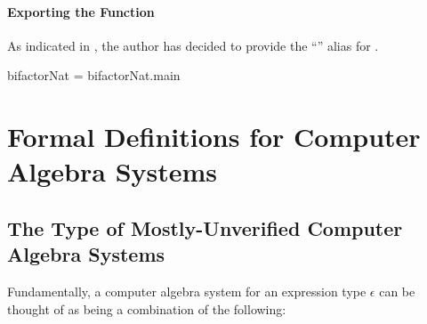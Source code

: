 \documentclass{report}
\begin{document}
\subsection{Exporting the Function}
As indicated in , the author has decided to provide the ``'' alias for .

\begin{code}
bifactorNat = bifactorNat.main
\end{code}

\part{Formal Definitions for Computer Algebra Systems}

\chapter{The Type of Mostly-Unverified Computer Algebra Systems}
Fundamentally, a computer algebra system for an expression type \(\epsilon\) can be thought of as being a combination of the following:
\end{document}
